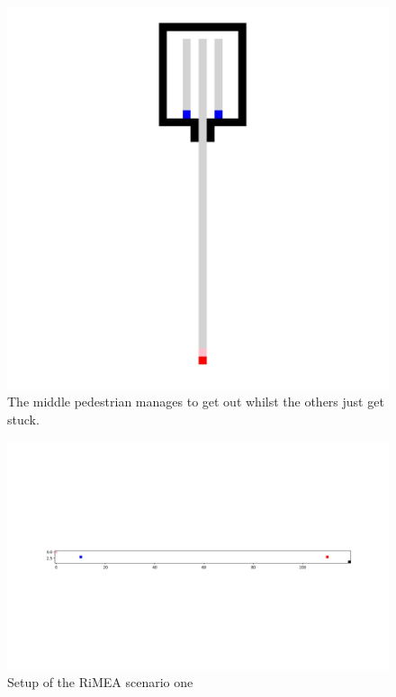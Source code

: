 \documentclass[10pt,a4paper]{article}
\begin{document}
\begin{figure}[h!]
    \centering
    \includegraphics[width=\textwidth]{pictures/task4_cong_stuck.jpeg}
    \caption{The middle pedestrian manages to get out whilst the others just get stuck.}
    \label{fig:cong_stuck}
\end{figure}
\begin{figure}
    \centering
    \includegraphics[width=\textwidth]{pictures/Test1start.png}
    \caption{Setup of the RiMEA scenario one}
    \label{fig:setup_test1}
\end{figure}
\end{document}
